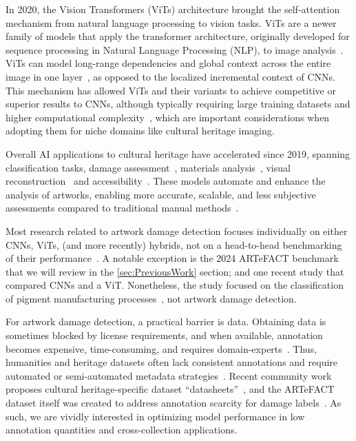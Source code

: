 \documentclass[conference]{IEEEtran}
\begin{document}
In 2020, the Vision Transformers (ViTs) architecture brought the self-attention mechanism from natural language processing to vision tasks. ViTs are a newer family of models that apply the transformer architecture, originally developed for sequence processing in Natural Language Processing (NLP), to image analysis~\cite{mauricio_comparing_2023}. ViTs can model long-range dependencies and global context across the entire image in one layer~\cite{mauricio_comparing_2023}, as opposed to the localized incremental context of CNNs. This mechanism has allowed ViTs and their variants to achieve competitive or superior results to CNNs, although typically requiring large training datasets and higher computational complexity~\cite{ali_vision_2023,elharrouss_vits_2025,yunusa_exploring_2024,dosovitskiy_image_2021}, which are important considerations when adopting them for niche domains like cultural heritage imaging.

Overall AI applications to cultural heritage have accelerated since 2019, spanning classification tasks, damage assessment~\cite{hou_using_2024,kwon_automatic_2019,samhouri_prediction_2022}, materials analysis~\cite{go_comparison_2025}, visual reconstruction~\cite{yi_zhang_artificial_2025} and accessibility~\cite{girbacia_analysis_2024,mishra_artificial_2024}. These models automate and enhance the analysis of artworks, enabling more accurate, scalable, and less subjective assessments compared to traditional manual methods~\cite{sankar_transforming_2023,ali_vision_2023,yunusa_exploring_2024}.

Most research related to artwork damage detection focuses individually on either CNNs, ViTs, (and more recently) hybrids, not on a head-to-head benchmarking of their performance~\cite{ali_vision_2023,samhouri_prediction_2022,roy_multimodal_2023}. A notable exception is the 2024 ARTeFACT benchmark~\cite{ivanova_artefact_2024} that we will review in the \ref{sec:PreviousWork} section; and one recent study that compared CNNs and a ViT. Nonetheless, the study focused on the classification of pigment manufacturing processes~\cite{go_comparison_2025}, not artwork damage detection.

For artwork damage detection, a practical barrier is data. Obtaining data is sometimes blocked by license requirements, and when available, annotation becomes expensive, time-consuming, and requires domain-experts~\cite{ivanova_artefact_2024}. Thus, humanities and heritage datasets often lack consistent annotations and require automated or semi-automated metadata strategies~\cite{diem_automatic_nodate}. Recent community work proposes cultural heritage-specific dataset “datasheets”~\cite{alkemade_datasheets_2023}, and the ARTeFACT dataset itself was created to address annotation scarcity for damage labels~\cite{ivanova_artefact_2024}. As such, we are vividly interested in optimizing model performance in low annotation quantities and cross-collection applications.
\end{document}
